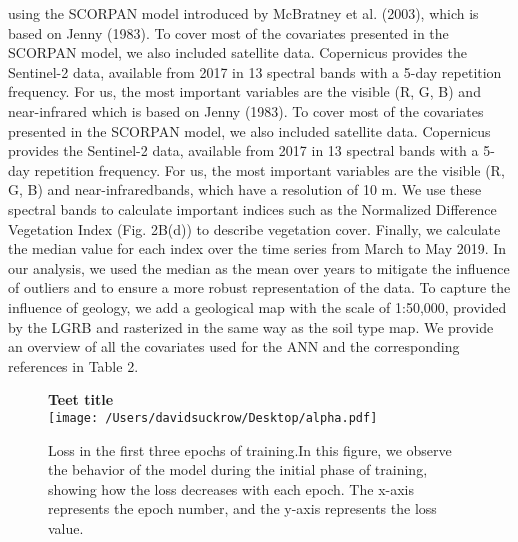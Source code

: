 using the SCORPAN model introduced by McBratney et al. (2003),
which is based on Jenny (1983). To cover most of the covariates presented
in the SCORPAN model, we also included satellite data. Copernicus
provides the Sentinel-2 data, available from 2017 in 13 spectral
bands with a 5-day repetition frequency. For us, the most important
variables are the visible (R, G, B) and near-infrared which is based on Jenny (1983). To cover most of the covariates presented
in the SCORPAN model, we also included satellite data. Copernicus
provides the Sentinel-2 data, available from 2017 in 13 spectral
bands with a 5-day repetition frequency. For us, the most important
variables are the visible (R, G, B) and near-infraredbands, which have a
resolution of 10 m. We use these spectral bands to calculate important
indices such as the Normalized Difference Vegetation Index (Fig. 2B(d))
to describe vegetation cover. Finally, we calculate the median value for
each index over the time series from March to May 2019. In our analysis,
we used the median as the mean over years to mitigate the influence of
outliers and to ensure a more robust representation of the data. To
capture the influence of geology, we add a geological map with the scale
of 1:50,000, provided by the LGRB and rasterized in the same way as the
soil type map. We provide an overview of all the covariates used for the
ANN and the corresponding references in Table 2.

\begin{figure}[h]
    \centering
    \textbf{Teet title}\\
    \captionsetup{justification=justified}
    \texttt{[image: /Users/davidsuckrow/Desktop/alpha.pdf]}  %
    \caption[test]{Loss in the first three epochs of training.In this figure, we observe 
    the behavior of the model during the initial phase of training, showing how the loss decreases with each epoch. The x-axis represents the epoch number, and the y-axis represents the loss value. }  %
    \captionsetup{justification=justified}  %
    \label{fig:example}
\end{figure}


